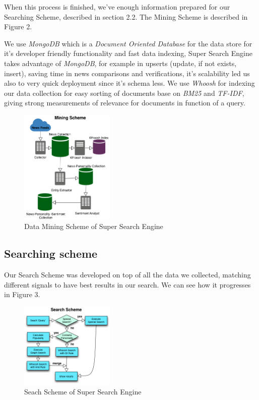 \documentclass{acm_proc_article-sp}
\begin{document}
When this process is finished, we've enough information prepared for our Searching Scheme, described in section 2.2. The Mining Scheme is described in Figure 2.

We use \textit{MongoDB} which is a \textit{Document Oriented Database} for the data store for it's developer friendly functionality and fast data indexing, Super Search Engine takes advantage of \textit{MongoDB}, for example in upserts (update, if not exists, insert), saving time in news comparisons and verifications, it's scalability led us also to very quick deployment since it's schema less.
We use \textit{Whoosh} for indexing our data collection for easy sorting of documents base on \textit{BM25} and \textit{TF-IDF}, giving strong measurements of relevance for documents in function of a query.

	\begin{figure}[h]
   	\centering
   	\includegraphics[width=0.40\textwidth]{MiningScheme.png}
   	\caption{Data Mining Scheme of Super Search Engine}
	\end{figure}


\subsection{Searching scheme}

Our Search Scheme was developed on top of all the data we collected, matching different signals to have best results in our search. We can see how it progresses in Figure 3.

	\begin{figure}[h]
   	\centering
   	\includegraphics[width=0.40\textwidth]{SearchScheme.png}
   	\caption{Seach Scheme of Super Search Engine}
	\end{figure}
\end{document}
